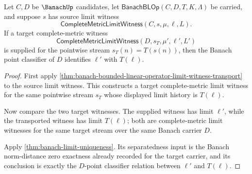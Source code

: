 \begin{theorem}
\label{thm:banach-bounded-linear-operator-limit-commutation}
Let $C,D$ be $\BanachUp$ candidates, let
$\mathsf{BanachBLOp}(C,D,T,K,\Lambda)$ be carried, and suppose $s$ has source
limit witness
$$
\mathsf{CompleteMetricLimitWitness}(C,s,\mu,\ell,L).
$$
If a target complete-metric witness
$$
\mathsf{CompleteMetricLimitWitness}(D,s_T,\mu',\ell',L')
$$
is supplied for the pointwise stream $s_T(n)=T(s(n))$, then the Banach point
classifier of $D$ identifies $\ell'$ with $T(\ell)$.
\end{theorem}
\begin{proof}
First apply
\autoref{thm:banach-bounded-linear-operator-limit-witness-transport} to the
source limit witness. This constructs a target complete-metric limit witness
for the same pointwise stream $s_T$ whose displayed limit history is
$T(\ell)$.

Now compare the two target witnesses. The supplied witness has limit
$\ell'$, while the transported witness has limit $T(\ell)$; both are
complete-metric limit witnesses for the same target stream over the same
Banach carrier $D$.

Apply \autoref{thm:banach-limit-uniqueness}. Its separatedness input is the
Banach norm-distance zero exactness already recorded for the target carrier,
and its conclusion is exactly the $D$-point classifier relation between
$\ell'$ and $T(\ell)$.
\end{proof}

